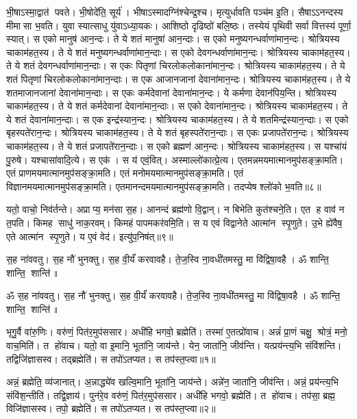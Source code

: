 भी॒षाऽस्मा॒द्वात॑ पवते। भी॒षोदे॑ति॒ सूर्य॑। भीषाऽस्मादग्नि॑\-श्चेन्द्र॒श्च। मृत्युर्धावति पञ्च॑म इ॒ति। सैषाऽऽनन्दस्य मीमासा भ॒वति। युवा स्यात्साधु यु॑वाऽध्या॒यकः। आशिष्ठो दृढिष्ठो॑ बलि॒ष्ठः। तस्येयं पृथिवी सर्वा वित्तस्य॑ पूर्णा॒ स्यात्। स एको मानुष॑ आन॒न्दः। ते ये शतं मानुषा॑ आन॒न्दाः। स एको मनुष्यगन्धर्वाणा॑मान॒न्दः। श्रोत्रियस्य चाकाम॑हत॒स्य। ते ये शतं मनुष्यगन्धर्वाणा॑मान॒न्दाः। स एको देवगन्धर्वाणा॑मान॒न्दः। श्रोत्रियस्य चाकाम॑हत॒स्य। ते ये शतं देवगन्धर्वाणा॑मान॒न्दाः। स एकः पितृणां चिरलोकलोकाना॑मान॒न्दः। श्रोत्रियस्य चाकाम॑हत॒स्य। ते ये शतं पितृणां चिरलोकलोकाना॑\-मान॒न्दाः। स एक आजानजानां देवाना॑मान॒न्दः। श्रोत्रियस्य चाकाम॑हत॒स्य। ते ये शतमाजानजानां देवाना॑मान॒न्दाः। स एकः कर्मदेवानां देवाना॑मान॒न्दः। ये कर्मणा देवान॑पिय॒न्ति। श्रोत्रियस्य चाकाम॑हत॒स्य। ते ये शतं कर्मदेवानां देवाना॑मान॒न्दाः। स एको देवाना॑मान॒न्दः। श्रोत्रियस्य चाकाम॑हत॒स्य। ते ये शतं देवाना॑मान॒न्दाः। स एक इन्द्र॑स्यान॒न्दः। श्रोत्रियस्य चाकाम॑हत॒स्य। ते ये शतमिन्द्र॑स्यान॒न्दाः। स एको बृहस्पते॑रान॒न्दः। श्रोत्रियस्य चाकाम॑हत॒स्य। ते ये शतं बृहस्पते॑रान॒न्दाः। स एकः प्रजापते॑रान॒न्दः। श्रोत्रियस्य चाकाम॑हत॒स्य। ते ये शतं प्रजापते॑रान॒न्दाः। स एको ब्रह्मण॑ आन॒न्दः। श्रोत्रियस्य चाकाम॑हत॒स्य। स यश्चा॑यं पु॒रुषे। यश्चासा॑वादि॒त्ये। स एक॑। स य॑ एवं॒वित्। अस्माल्लो॑कात्प्रे॒त्य। एतमन्नमयमात्मानमुप॑सङ्क्रा॒मति। एतं प्राणमयमात्मानमुप॑सङ्क्रा॒मति। एतं मनोमयमात्मानमुप॑\-सङ्क्रा॒मति। एतं विज्ञानमयमात्मानमुप॑\-सङ्क्रा॒मति। एतमानन्द\-मयमात्मानमुप॑\-सङ्क्रा॒मति। तदप्येष श्लो॑को भ॒वति॥८॥

यतो॒ वाचो॒ निव॑र्तन्ते। अप्राप्य॒ मन॑सा स॒ह। आनन्दं ब्रह्म॑णो वि॒द्वान्। न बिभेति कुत॑श्चने॒ति। एत ह वाव॑ न त॒पति। किमह साधु॑ नाक॒रवम्। किमहं पापमकर॑वमि॒ति। स य एवं  विद्वानेते आत्मा॑न स्पृ॒णुते। उ॒भे ह्ये॑वैष॒ एते आत्मा॑न स्पृ॒णुते। य ए॒वं वेद॑। इत्यु॑प॒निष॑त्॥९॥

स॒ह ना॑ववतु। स॒ह नौ॑ भुनक्तु। स॒ह वी॒र्यं॑ करवावहै। ते॒ज॒स्वि ना॒वधी॑तमस्तु॒ मा वि॑द्विषा॒वहै। ॐ शान्ति॒ शान्ति॒ शान्ति॑॥

\setcounter{anuvakam}{0}
ॐ स॒ह ना॑ववतु। स॒ह नौ॑ भुनक्तु। स॒ह वी॒र्यं॑ करवावहै। ते॒ज॒स्वि ना॒वधी॑तमस्तु॒ मा वि॑द्विषा॒वहै। ॐ शान्ति॒ शान्ति॒ शान्ति॑॥


भृगु॒र्वै वा॑रु॒णिः। वरु॑णं॒ पित॑र॒मुप॑ससार। अधी॑हि भगवो॒ ब्रह्मेति॑। तस्मा॑ ए॒तत्प्रो॑वाच। अन्नं॑ प्रा॒णं चक्षु॒ श्रोत्रं॒ मनो॒ वाच॒मिति॑। त हो॑वाच। यतो॒ वा इ॒मानि॒ भूता॑नि॒ जाय॑न्ते। येन॒ जाता॑नि॒ जीव॑न्ति। यत्प्रय॑न्त्य॒भि संवि॑शन्ति। तद्विजि॑ज्ञासस्व। तद्ब्रह्मेति॑। स तपो॑ऽतप्यत। स तप॑स्त॒प्त्वा॥१॥

अन्नं॒ ब्रह्मेति॒ व्य॑जानात्। अ॒न्नाद्ध्ये॑व खल्वि॒मानि॒ भूता॑नि॒ जाय॑न्ते। अन्ने॑न॒ जाता॑नि॒ जीव॑न्ति। अन्नं॒ प्रय॑न्त्य॒भि  संवि॑श॒न्तीति॑। तद्वि॒ज्ञाय॑। पुन॑रे॒व वरु॑णं॒ पित॑र॒मुप॑ससार। अधी॑हि भगवो॒ ब्रह्मेति॑। त हो॑वाच। तप॑सा॒ ब्रह्म॒ विजि॑ज्ञासस्व। तपो॒ ब्रह्मेति॑। स तपो॑ऽतप्यत। स तप॑स्त॒प्त्वा॥२॥

